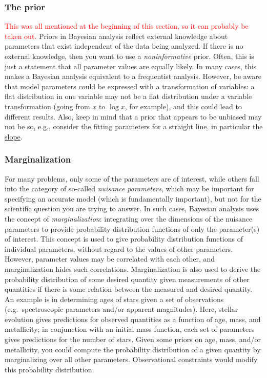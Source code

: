 \documentclass{article}
\begin{document}
\subsubsection{The prior}
\textcolor{red}{This was all mentioned at the beginning of this section,
so it can probably be taken out.}
Priors in Bayesian analysis reflect external knowledge about parameters that
exist independent of the data being analyzed. If there is no external
knowledge, then you want to use a \textit{noninformative} prior. Often, this is
just a statement that all parameter values are equally likely. In many cases,
this makes a Bayesian analysis equivalent to a frequentist analysis. However,
be aware that model parameters could be expressed with a transformation of
variables: a flat distribution in one variable may not be a flat distribution
under a variable transformation (going from $x$ to $\log{x}$, for example), and
this could lead to different results. Also, keep in mind that a prior that
appears to be unbiased may not be so, e.g., consider the fitting parameters for
a straight line, in particular the
\href{http://astronomy.nmsu.edu/holtz/a575/images/slope.png}
{slope}.

\subsubsection{Marginalization} For many problems, only some of the parameters
are of interest, while others fall into the category of so-called
\textit{nuisance parameters}, which may be important for specifying an accurate
model (which is fundamentally important), but not for the scientific question
you are trying to answer. In such cases, Bayesian analysis uses the concept of
\textit{marginalization}: integrating over the dimensions of the nuisance
parameters to provide probability distribution functions of only the
parameter(s) of interest. This concept is used to give probability distribution
functions of individual parameters, without regard to the values of other
parameters. However, parameter values may be correlated with each other, and
marginalization hides such correlations. Marginalization is also used to
derive the probability distribution of some desired quantity given measurements
of other quantities if there is some relation between the measured and desired
quantity. An example is in determining ages of stars given a set of
observations (e.g.\ spectroscopic parameters and/or apparent magnitudes). Here,
stellar evolution gives predictions for observed quantities as a function of
age, mass, and metallicity; in conjunction with an initial mass function, each
set of parameters gives predictions for the number of stars. Given some priors
on age, mass, and/or metallicity, you could compute the probability
distribution of a given quantity by marginalizing over all other parameters.
Observational constraints would modify this probability distribution.
\end{document}
